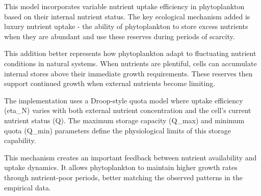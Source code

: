 This model incorporates variable nutrient uptake efficiency in phytoplankton based on their internal nutrient status. The key ecological mechanism added is luxury nutrient uptake - the ability of phytoplankton to store excess nutrients when they are abundant and use these reserves during periods of scarcity.

This addition better represents how phytoplankton adapt to fluctuating nutrient conditions in natural systems. When nutrients are plentiful, cells can accumulate internal stores above their immediate growth requirements. These reserves then support continued growth when external nutrients become limiting.

The implementation uses a Droop-style quota model where uptake efficiency (eta_N) varies with both external nutrient concentration and the cell's current nutrient status (Q). The maximum storage capacity (Q_max) and minimum quota (Q_min) parameters define the physiological limits of this storage capability.

This mechanism creates an important feedback between nutrient availability and uptake dynamics. It allows phytoplankton to maintain higher growth rates through nutrient-poor periods, better matching the observed patterns in the empirical data.
